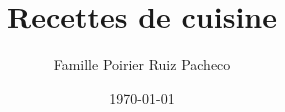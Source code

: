 \documentclass{livrerecettes}
\begin{document}
\title{Recettes de cuisine}
\author{Famille Poirier Ruiz Pacheco}
\date{\today}
\maketitle


\end{document}
